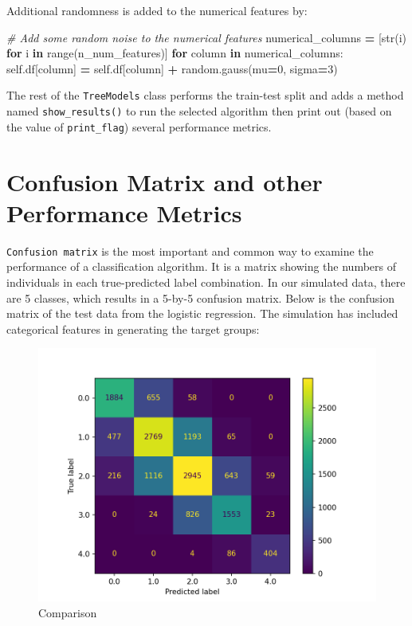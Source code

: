 \documentclass[
]{book}
\newenvironment{Shaded}{\begin{snugshade}}{\end{snugshade}}
\newcommand{\BuiltInTok}[1]{#1}
\newcommand{\CommentTok}[1]{\textcolor[rgb]{0.56,0.35,0.01}{\textit{#1}}}
\newcommand{\ControlFlowTok}[1]{\textcolor[rgb]{0.13,0.29,0.53}{\textbf{#1}}}
\newcommand{\DecValTok}[1]{\textcolor[rgb]{0.00,0.00,0.81}{#1}}
\newcommand{\KeywordTok}[1]{\textcolor[rgb]{0.13,0.29,0.53}{\textbf{#1}}}
\newcommand{\NormalTok}[1]{#1}
\newcommand{\OperatorTok}[1]{\textcolor[rgb]{0.81,0.36,0.00}{\textbf{#1}}}
\newcommand{\VariableTok}[1]{\textcolor[rgb]{0.00,0.00,0.00}{#1}}
\theoremstyle{definition}
\theoremstyle{definition}
\theoremstyle{definition}
\theoremstyle{definition}
\theoremstyle{remark}
\begin{document}
Additional randomness is added to the numerical features by:

\begin{Shaded}
\begin{Highlighting}[]
        \CommentTok{\# Add some random noise to the numerical features}
\NormalTok{        numerical\_columns }\OperatorTok{=}\NormalTok{ [}\BuiltInTok{str}\NormalTok{(i) }\ControlFlowTok{for}\NormalTok{ i }\KeywordTok{in} \BuiltInTok{range}\NormalTok{(n\_num\_features)]}
        \ControlFlowTok{for}\NormalTok{ column }\KeywordTok{in}\NormalTok{ numerical\_columns:}
            \VariableTok{self}\NormalTok{.df[column] }\OperatorTok{=} \VariableTok{self}\NormalTok{.df[column] }\OperatorTok{+}\NormalTok{ random.gauss(mu}\OperatorTok{=}\DecValTok{0}\NormalTok{, sigma}\OperatorTok{=}\DecValTok{3}\NormalTok{)}
\end{Highlighting}
\end{Shaded}

The rest of the \texttt{TreeModels} class performs the train-test split and adds a method named \texttt{show\_results()} to run the selected algorithm then print out (based on the value of \texttt{print\_flag}) several performance metrics.

\hypertarget{confusion-matrix-and-other-performance-metrics}{%
\section{Confusion Matrix and other Performance Metrics}\label{confusion-matrix-and-other-performance-metrics}}

\texttt{Confusion\ matrix} is the most important and common way to examine the performance of a classification algorithm. It is a matrix showing the numbers of individuals in each true-predicted label combination. In our simulated data, there are 5 classes, which results in a 5-by-5 confusion matrix. Below is the confusion matrix of the test data from the logistic regression. The simulation has included categorical features in generating the target groups:

\begin{figure}
\centering
\includegraphics{images/cm_logit_False.png}
\caption{Comparison}
\end{figure}
\end{document}
